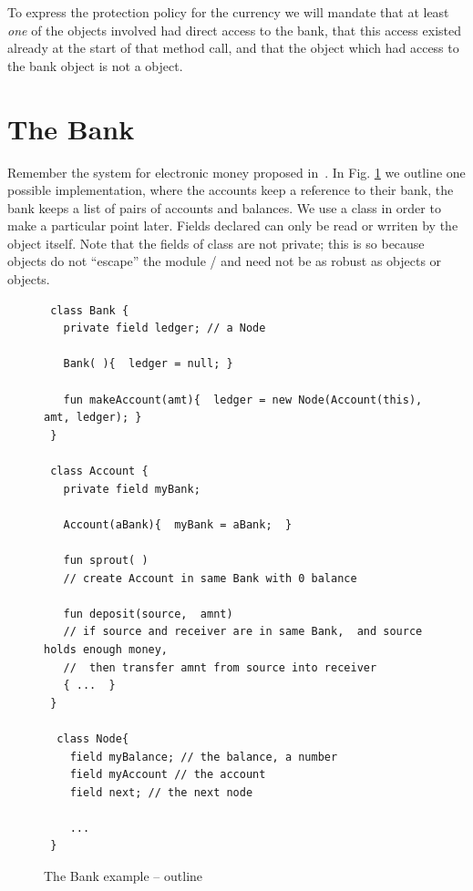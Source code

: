 \documentclass[acmsmall,screen]{acmart}
\begin{document}
 \vspace{.1cm}
   To express the protection policy for the currency we will mandate that at least {\em one} of the objects involved had 
   direct access to the bank,   that this access existed already at the start of that method call, and that the object which had access to the bank
   object is  not a  object. 




\section{The Bank}
\label{s-example}
\mathcal{}
Remember the system for electronic money
proposed in~\cite{ELang}. In Fig. \ref{fig:Bank} we outline one possible implementation, where 
the accounts keep a reference to their bank, the bank keeps a
list of pairs of accounts and balances. We use a class  in order to make a particular point later.
Fields declared   can only be read or wrriten by the object itself. Note that the fields of class  are
not private; this is so because  objects do not ``escape'' the module / and 
need not be as 
robust as    objects or  objects.
 
\begin{figure}[tbp]
\begin{lstlisting}
 class Bank {  
   private field ledger; // a Node
     
   Bank( ){  ledger = null; }
      
   fun makeAccount(amt){  ledger = new Node(Account(this), amt, ledger); }
 }           

 class Account {
   private field myBank;

   Account(aBank){  myBank = aBank;  }
  
   fun sprout( )
   // create Account in same Bank with 0 balance

   fun deposit(source,  amnt)
   // if source and receiver are in same Bank,  and source holds enough money,
   //  then transfer amnt from source into receiver
   { ...  }
 }
  
  class Node{
    field myBalance; // the balance, a number
    field myAccount // the account
    field next; // the next node
    
    ...
 }
\end{lstlisting}
\caption{The Bank example -- outline}
\label{fig:Bank}
 \end{figure}
\end{document}
